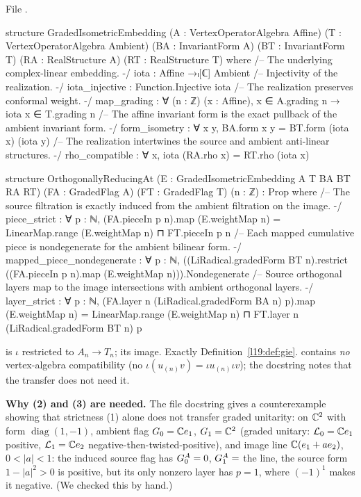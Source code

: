 \noindent File .
\begin{leancode}
structure GradedIsometricEmbedding
    (A : VertexOperatorAlgebra Affine) (T : VertexOperatorAlgebra Ambient)
    (BA : InvariantForm A) (BT : InvariantForm T)
    (RA : RealStructure A) (RT : RealStructure T) where
  /-- The underlying complex-linear embedding. -/
  iota : Affine →ₗ[ℂ] Ambient
  /-- Injectivity of the realization. -/
  iota_injective : Function.Injective iota
  /-- The realization preserves conformal weight. -/
  map_grading : ∀ (n : ℤ) (x : Affine), x ∈ A.grading n → iota x ∈ T.grading n
  /-- The affine invariant form is the exact pullback of the ambient invariant form. -/
  form_isometry : ∀ x y, BA.form x y = BT.form (iota x) (iota y)
  /-- The realization intertwines the source and ambient anti-linear structures. -/
  rho_compatible : ∀ x, iota (RA.rho x) = RT.rho (iota x)

structure OrthogonallyReducingAt
    (E : GradedIsometricEmbedding A T BA BT RA RT)
    (FA : GradedFlag A) (FT : GradedFlag T) (n : ℤ) : Prop where
  /-- The source filtration is exactly induced from the ambient filtration on the image. -/
  piece_strict : ∀ p : ℕ,
    (FA.pieceIn p n).map (E.weightMap n) =
      LinearMap.range (E.weightMap n) ⊓ FT.pieceIn p n
  /-- Each mapped cumulative piece is nondegenerate for the ambient bilinear form. -/
  mapped_piece_nondegenerate : ∀ p : ℕ,
    ((LiRadical.gradedForm BT n).restrict
      ((FA.pieceIn p n).map (E.weightMap n))).Nondegenerate
  /-- Source orthogonal layers map to the image intersections with ambient orthogonal layers. -/
  layer_strict : ∀ p : ℕ,
    (FA.layer n (LiRadical.gradedForm BA n) p).map (E.weightMap n) =
      LinearMap.range (E.weightMap n) ⊓
        FT.layer n (LiRadical.gradedForm BT n) p
\end{leancode}

\begin{dictionary}
 is $\iota$ restricted to $A_n\to T_n$;  its image. Exactly
Definition~\ref{l19:def:gie}.  contains \emph{no} vertex-algebra compatibility
(no $\iota(u_{(n)}v) = \iota u_{(n)}\iota v$); the docstring notes that the transfer does not need it.

\textbf{Why (2) and (3) are needed.} The file docstring gives a counterexample showing that strictness (1)
alone does not transfer graded unitarity: on ${\mathbb{C}}^2$ with form $\operatorname{diag}(1,-1)$, ambient flag
$G_0 = {\mathbb{C}} e_1$, $G_1 = {\mathbb{C}}^2$ (graded unitary: $\mathcal{L}_0 = {\mathbb{C}} e_1$ positive, $\mathcal{L}_1 = {\mathbb{C}} e_2$
negative-then-twisted-positive), and image line ${\mathbb{C}}(e_1+ae_2)$, $0<|a|<1$: the induced source flag has
$G^A_0 = 0$, $G^A_1 = $ the line, the source form $1-|a|^2>0$ is positive, but its only nonzero layer
has $p = 1$, where $(-1)^1$ makes it negative. (We checked this by hand.)
\end{dictionary}

